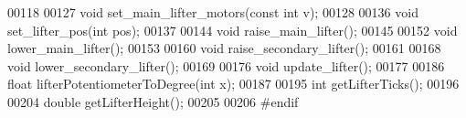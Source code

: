 \begin{DoxyCode}
00118 
00127 \textcolor{keywordtype}{void} set_main_lifter_motors(\textcolor{keyword}{const} \textcolor{keywordtype}{int} v);
00128 
00136 \textcolor{keywordtype}{void} set_lifter_pos(\textcolor{keywordtype}{int} pos);
00137 
00144 \textcolor{keywordtype}{void} raise_main_lifter();
00145 
00152 \textcolor{keywordtype}{void} lower_main_lifter();
00153 
00160 \textcolor{keywordtype}{void} raise_secondary_lifter();
00161 
00168 \textcolor{keywordtype}{void} lower_secondary_lifter();
00169 
00176 \textcolor{keywordtype}{void} update_lifter();
00177 
00186 \textcolor{keywordtype}{float} lifterPotentiometerToDegree(\textcolor{keywordtype}{int} x);
00187 
00195 \textcolor{keywordtype}{int} getLifterTicks();
00196 
00204 \textcolor{keywordtype}{double} getLifterHeight();
00205 
00206 \textcolor{preprocessor}{#endif}
\end{DoxyCode}
